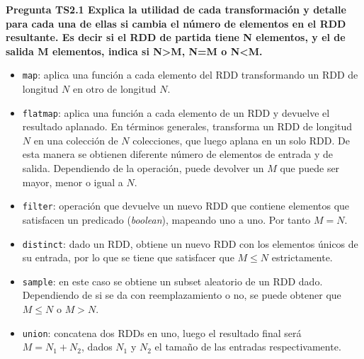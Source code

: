 \documentclass[10pt,swedish, openany]{book}
\begin{document}
\textbf{Pregunta TS2.1 Explica la utilidad de cada transformación y detalle para cada una de ellas si cambia el número de elementos en el RDD resultante. Es decir si el RDD de partida tiene N elementos, y el de salida M elementos, indica si N>M, N=M o N<M.}
\begin{itemize}
    \item \texttt{map}: aplica una función a cada elemento del RDD transformando un RDD de longitud $N$ en otro de longitud $N$.
    \item \texttt{flatmap}: aplica una función a cada elemento de un RDD y devuelve el resultado aplanado. En términos generales, transforma un RDD de longitud $N$ en una colección de $N$ colecciones, que luego aplana en un solo RDD. De esta manera se obtienen diferente número de elementos de entrada y de salida. Dependiendo de la operación, puede devolver un $M$ que puede ser mayor, menor o igual a $N$.
    \item \texttt{filter}: operación que devuelve un nuevo RDD que contiene elementos que satisfacen un predicado (\textit{boolean}), mapeando uno a uno. Por tanto $M=N$.
    \item \texttt{distinct}: dado un RDD, obtiene un nuevo RDD con los elementos únicos de su entrada, por lo que se tiene que satisfacer que $M \leq N$ estrictamente.
    \item \texttt{sample}: en este caso se obtiene un subset aleatorio de un RDD dado. Dependiendo de si se da con reemplazamiento o no, se puede obtener que $M \leq N$ o $M>N$.
    \item \texttt{union}: concatena dos RDDs en uno, luego el resultado final será $M=N_1 + N_2$, dados $N_1$ y $N_2$ el tamaño de las entradas respectivamente.
\end{itemize}

\vspace{0.8em}
\end{document}
